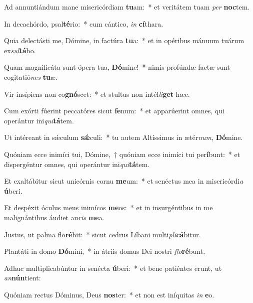 \item Ad annuntiándum mane misericórdiam \textbf{tu}am:~* et veritátem tuam \textit{per} \textbf{noc}tem.
\item In decachórdo, psal\textbf{té}rio:~* cum cántico, \textit{in} \textbf{cí}thara.
\item Quia delectásti me, Dómine, in factúra \textbf{tu}a:~* et in opéribus mánuum tuárum ex\textit{sul}\textbf{tá}bo.
\item Quam magnificáta sunt ópera tua, \textbf{Dó}mine!~* nimis profúndæ factæ sunt cogitatió\textit{nes} \textbf{tu}æ.
\item Vir insípiens non co\textbf{gnó}scet:~* et stultus non intél\textit{li}\textbf{get} hæc.
\item Cum exórti fúerint peccatóres sicut \textbf{fe}num:~* et apparúerint omnes, qui operántur ini\textit{qui}\textbf{tá}tem.
\item Ut intéreant in sǽculum \textbf{sǽ}culi:~* tu autem Altíssimus in ætér\textit{num}, \textbf{Dó}mine.
\item Quóniam ecce inimíci tui, Dómine,~† quóniam ecce inimíci tui per\textbf{í}bunt:~* et dispergéntur omnes, qui operántur ini\textit{qui}\textbf{tá}tem.
\item Et exaltábitur sicut unicórnis cornu \textbf{me}um:~* et senéctus mea in misericórdi\textit{a} \textbf{ú}beri.
\item Et despéxit óculus meus inimícos \textbf{me}os:~* et in insurgéntibus in me malignántibus áudiet au\textit{ris} \textbf{me}a.
\item Justus, ut palma flo\textbf{ré}bit:~* sicut cedrus Líbani multi\textit{pli}\textbf{cá}bitur.
\item Plantáti in domo \textbf{Dó}mini,~* in átriis domus Dei nostri \textit{flo}\textbf{ré}bunt.
\item Adhuc multiplicabúntur in senécta \textbf{ú}beri:~* et bene patiéntes erunt, ut \textit{an}\textbf{nún}tient:
\item Quóniam rectus Dóminus, Deus \textbf{nos}ter:~* et non est iníquitas \textit{in} \textbf{e}o.
